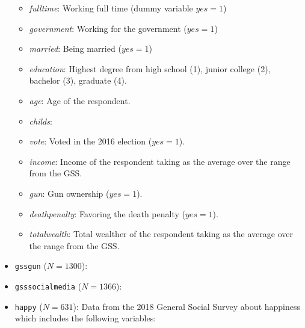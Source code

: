 \documentclass[
]{article}
\begin{document}
\begin{itemize}
  \begin{itemize}
          \item \emph{fulltime}: Working full time (dummy variable $yes=1$)
          \item \emph{government}: Working for the government ($yes=1$)
          \item \emph{married}: Being married ($yes=1$) 
          \item \emph{education}: Highest degree from high school (1), junior college (2),  bachelor (3), graduate (4). 
          \item \emph{age}: Age of the respondent.
          \item \emph{childs}:
          \item \emph{vote}: Voted in the 2016 election ($yes=1$).
          \item \emph{income}: Income of the respondent taking as the average over the range from the GSS.
          \item \emph{gun}: Gun ownership ($yes=1$).
          \item \emph{deathpenalty}: Favoring the death penalty ($yes=1$).
          \item \emph{totalwealth}: Total wealther of the respondent taking as the average over the range from the GSS.
     \end{itemize}
\item
  \texttt{gssgun} (\(N=1300\)):
\item
  \texttt{gsssocialmedia} (\(N=1366\)):
\item
  \texttt{happy} (\(N=631\)): Data from the 2018 General Social Survey about happiness which includes the following variables:


\end{itemize}
\end{document}
